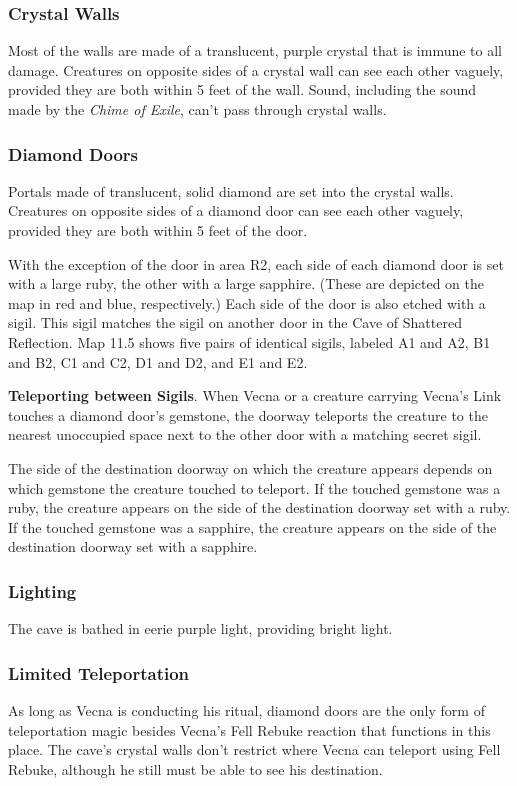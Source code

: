 \documentclass[10pt,a4paper,twoside,bg=print,twocolumn,openany,nodeprecatedcode]{dndbook}
\begin{document}
\subsubsection{Crystal Walls}
Most of the walls are made of a translucent, purple crystal that is immune to all damage. Creatures on opposite sides of a crystal wall can see each other vaguely, provided they are both within 5 feet of the wall. Sound, including the sound made by the \textit{Chime of Exile}, can't pass through crystal walls.

\subsubsection{Diamond Doors}
Portals made of translucent, solid diamond are set into the crystal walls. Creatures on opposite sides of a diamond door can see each other vaguely, provided they are both within 5 feet of the door.

With the exception of the door in area R2, each side of each diamond door is set with a large ruby, the other with a large sapphire. (These are depicted on the map in red and blue, respectively.) Each side of the door is also etched with a sigil. This sigil matches the sigil on another door in the Cave of Shattered Reflection. Map 11.5 shows five pairs of identical sigils, labeled A1 and A2, B1 and B2, C1 and C2, D1 and D2, and E1 and E2.

\textbf{Teleporting between Sigils}. When Vecna or a creature carrying Vecna's Link touches a diamond door's gemstone, the doorway teleports the creature to the nearest unoccupied space next to the other door with a matching secret sigil.

The side of the destination doorway on which the creature appears depends on which gemstone the creature touched to teleport. If the touched gemstone was a ruby, the creature appears on the side of the destination doorway set with a ruby. If the touched gemstone was a sapphire, the creature appears on the side of the destination doorway set with a sapphire.

\subsubsection{Lighting}
The cave is bathed in eerie purple light, providing bright light.

\subsubsection{Limited Teleportation}
As long as Vecna is conducting his ritual, diamond doors are the only form of teleportation magic besides Vecna's Fell Rebuke reaction that functions in this place. The cave's crystal walls don't restrict where Vecna can teleport using Fell Rebuke, although he still must be able to see his destination.
\end{document}

